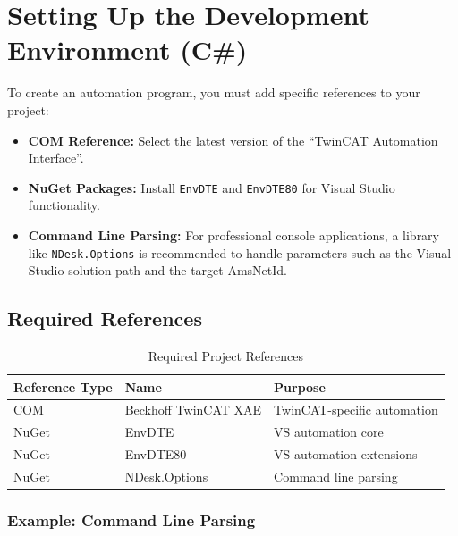 \documentclass[11pt,a4paper]{article}
\begin{document}
\section{Setting Up the Development Environment (C\#)}

To create an automation program, you must add specific references to your project:

\begin{itemize}[leftmargin=*]
    \item \textbf{COM Reference:} Select the latest version of the ``TwinCAT Automation Interface''.
    \item \textbf{NuGet Packages:} Install \texttt{EnvDTE} and \texttt{EnvDTE80} for Visual Studio functionality.
    \item \textbf{Command Line Parsing:} For professional console applications, a library like \texttt{NDesk.Options} is recommended to handle parameters such as the Visual Studio solution path and the target AmsNetId.
\end{itemize}

\subsection{Required References}

\begin{table}[h]
\centering
\begin{tabular}{@{}lll@{}}
\toprule
\textbf{Reference Type} & \textbf{Name} & \textbf{Purpose} \\
\midrule
COM & Beckhoff TwinCAT XAE & TwinCAT-specific automation \\
NuGet & EnvDTE & VS automation core \\
NuGet & EnvDTE80 & VS automation extensions \\
NuGet & NDesk.Options & Command line parsing \\
\bottomrule
\end{tabular}
\caption{Required Project References}
\end{table}

\subsubsection*{Example: Command Line Parsing}
\end{document}
